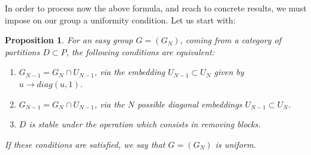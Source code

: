 \documentclass[12pt]{amsbook}
\newtheorem{proposition}[theorem]{Proposition}
\begin{document}
In order to process now the above formula, and reach to concrete results, we must impose on our group a uniformity condition. Let us start with:


\begin{proposition}
For an easy group $G=(G_N)$, coming from a category of partitions $D\subset P$, the following conditions are equivalent:
\begin{enumerate}
\item $G_{N-1}=G_N\cap U_{N-1}$, via the embedding $U_{N-1}\subset U_N$ given by $u\to diag(u,1)$.

\item $G_{N-1}=G_N\cap U_{N-1}$, via the $N$ possible diagonal embeddings $U_{N-1}\subset U_N$.

\item $D$ is stable under the operation which consists in removing blocks.
\end{enumerate}
If these conditions are satisfied, we say that $G=(G_N)$ is uniform.
\end{proposition}
\end{document}
